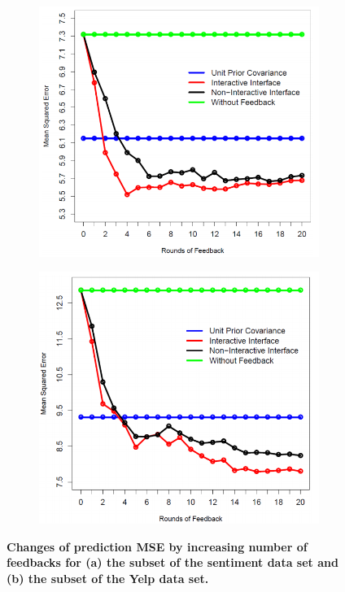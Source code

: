 \documentclass{sig-alternate}
\begin{document}
\begin{figure}[h!]
  \centering
  \begin{subfigure}[b]{0.4\linewidth}
    \includegraphics[width=\linewidth]{images/OBRAZOKGRAF2A.png}
   \caption{}
  \end{subfigure}
  \begin{subfigure}[b]{0.4\linewidth}
    \includegraphics[width=\linewidth]{images/OBRAZOKGRAF2B.png}
   \caption{}
  \end{subfigure}
\caption{ \textbf{ Changes of prediction MSE by increasing number
of feedbacks for (a) the subset of the sentiment data set and
(b) the subset of the Yelp data set.}}
  \label{obrazokgraf}
\end{figure}
\end{document}

